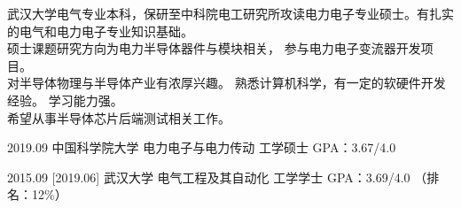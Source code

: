 \documentclass[zh]{resume}
\begin{document}
\makeheader

{\onehalfspacing\hspace{0em}%
武汉大学电气专业本科，保研至中科院电工研究所攻读电力电子专业硕士。有扎实的电气和电力电子专业知识基础。\\
硕士课题研究方向为电力半导体器件与模块相关，
参与电力电子变流器开发项目。\\
对半导体物理与半导体产业有浓厚兴趣。
熟悉计算机科学，有一定的软硬件开发经验。
学习能力强。\\
希望从事半导体芯片后端测试相关工作。
\par}

\begin{educations}
  \education%
    {2019.09}%
    {中国科学院大学}%
    {电力电子与电力传动}%
    {工学硕士}%
    {GPA：3.67/4.0}
    

  \separator{0.1ex}
  \education%
    {2015.09}%
    [2019.06]%
    {武汉大学}%
    {电气工程及其自动化}%
    {工学学士}%
    {GPA：3.69/4.0 （排名：12\%）}
\end{educations}

\begin{competences}

    
\end{competences}
\end{document}
